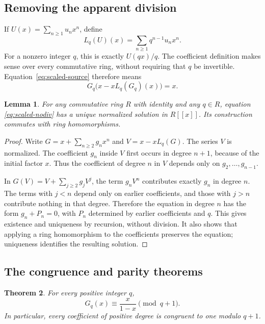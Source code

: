 \documentclass[11pt,a4paper]{article}
\newtheorem{theorem}{Theorem}[section]
\newtheorem{lemma}[theorem]{Lemma}
\theoremstyle{remark}\newtheorem{remark}[theorem]{Remark}
\begin{document}
\subsection{Removing the apparent division}

If $U(x)=\sum_{n\ge1}u_nx^n$, define
\[
L_q(U)(x)=\sum_{n\ge1}q^{n-1}u_nx^n.
\]
For a nonzero integer $q$, this is exactly $U(qx)/q$. The coefficient
definition makes sense over every commutative ring, without requiring
that $q$ be invertible. Equation~\eqref{eq:scaled-source} therefore
means
\begin{equation}\label{eq:scaled-nodiv}
G_q\bigl(x-xL_q(G_q)(x)\bigr)=x.
\end{equation}

\begin{lemma}\label{lem:scaled-unique}
For any commutative ring $R$ with identity and any $q\in R$, equation
\eqref{eq:scaled-nodiv} has a unique normalized solution in $R[[x]]$.
Its construction commutes with ring homomorphisms.
\end{lemma}

\begin{proof}
Write $G=x+\sum_{n\ge2}g_nx^n$ and
$V=x-xL_q(G)$. The series $V$ is normalized. The coefficient $g_n$
inside $V$ first occurs in degree $n+1$, because of the initial
factor $x$. Thus the coefficient of degree $n$ in $V$ depends
only on $g_2,\ldots,g_{n-1}$.

In $G(V)=V+\sum_{j\ge2}g_jV^j$, the term $g_nV^n$ contributes
exactly $g_n$ in degree $n$. The terms with $j<n$ depend only on
earlier coefficients, and those with $j>n$ contribute nothing in
that degree. Therefore the equation in degree $n$ has the form
$g_n+P_n=0$, with $P_n$ determined by earlier coefficients and $q$.
This gives existence and uniqueness by recursion, without division.
It also shows that applying a ring homomorphism to the coefficients
preserves the equation; uniqueness identifies the resulting solution.
\end{proof}

\subsection{The congruence and parity theorems}

\begin{theorem}\label{thm:scaled-congruence}
For every positive integer $q$,
\[
G_q(x)\equiv\frac{x}{1-x}\pmod{q+1}.
\]
In particular, every coefficient of positive degree is congruent to
one modulo $q+1$.
\end{theorem}
\end{document}
